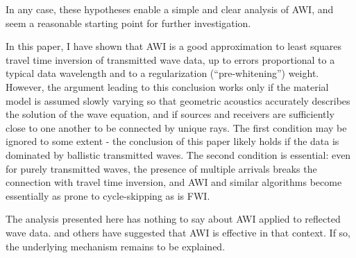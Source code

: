 In any case, these hypotheses enable a simple and clear
analysis of AWI, and seem a reasonable starting point for further
investigation.

In this paper, I have shown that AWI is a good approximation to least
squares travel time inversion of transmitted wave data, up to errors proportional to a typical
data wavelength and to a regularization (``pre-whitening'')
weight. However, the argument leading to this conclusion works only if
the material model is assumed slowly varying so that geometric
acoustics accurately describes the solution of the wave equation, and if
sources and receivers are sufficiently close to one another to be
connected by unique rays. The first condition may be ignored to some
extent - the conclusion of this paper likely holds if the data is
dominated by ballistic transmitted waves. The second condition
is essential: even for purely transmitted waves, the presence of
multiple arrivals breaks the connection
with travel time inversion, and AWI and similar algorithms
become essentially as prone to cycle-skipping as is FWI.


The analysis presented here has nothing to say about AWI applied to
reflected wave data. \cite{Warner:16} and others have
suggested that AWI is effective in that context. If so, the underlying
mechanism remains to be explained. 





